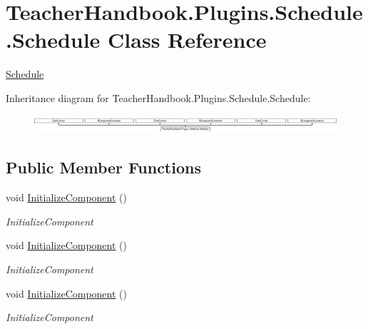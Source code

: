 \hypertarget{class_teacher_handbook_1_1_plugins_1_1_schedule_1_1_schedule}{}\section{Teacher\+Handbook.\+Plugins.\+Schedule.\+Schedule Class Reference}
\label{class_teacher_handbook_1_1_plugins_1_1_schedule_1_1_schedule}


\mbox{\hyperlink{class_teacher_handbook_1_1_plugins_1_1_schedule_1_1_schedule}{Schedule}}  


Inheritance diagram for Teacher\+Handbook.\+Plugins.\+Schedule.\+Schedule\+:\begin{figure}[H]
\begin{center}
\leavevmode
\includegraphics[height=0.659600cm]{dc/d1d/class_teacher_handbook_1_1_plugins_1_1_schedule_1_1_schedule}
\end{center}
\end{figure}
\subsection*{Public Member Functions}
\begin{DoxyCompactItemize}
\item 
void \mbox{\hyperlink{class_teacher_handbook_1_1_plugins_1_1_schedule_1_1_schedule_a4e0847c918304d0ce088671e13e8f9a6}{Initialize\+Component}} ()
\begin{DoxyCompactList}\small\item\em Initialize\+Component \end{DoxyCompactList}\item 
void \mbox{\hyperlink{class_teacher_handbook_1_1_plugins_1_1_schedule_1_1_schedule_a4e0847c918304d0ce088671e13e8f9a6}{Initialize\+Component}} ()
\begin{DoxyCompactList}\small\item\em Initialize\+Component \end{DoxyCompactList}\item 
void \mbox{\hyperlink{class_teacher_handbook_1_1_plugins_1_1_schedule_1_1_schedule_a4e0847c918304d0ce088671e13e8f9a6}{Initialize\+Component}} ()
\begin{DoxyCompactList}\small\item\em Initialize\+Component \end{DoxyCompactList}\end{DoxyCompactItemize}
